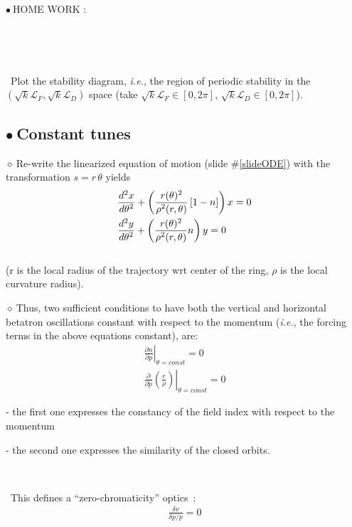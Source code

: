 \documentclass[12pt]{article}
\newcommand{\ie}{\textsl{i.e.}}
\newcommand{\nib}{\noindent \ensuremath{\bullet~}}
\newcommand{\nid}{\noindent \ensuremath{\diamond~}}
\newcommand{\nin}{\noindent~}
\newcommand{\blue}{\color{blue}}
\begin{document}
\clearpage



{\blue 

\fontsize{30}{36} \selectfont

\nib HOME WORK  : 

~

~


\nin Plot the stability diagram, \ie, the region of periodic stability 
in the  $(\sqrt{k} \mathcal{L}_F,  \sqrt{k} \mathcal{L}_D)$ space (take $\sqrt{k} \mathcal{L}_F\in[0, 2\pi]$, $  \sqrt{k} \mathcal{L}_D\in [0,2\pi]$).
}







\clearpage


{\fontsize{18}{28} \selectfont

\subsection*{\LARGE \nib  Constant tunes}


\nid Re-write the linearized equation of motion (slide \#\ref{slideODE})
with  the transformation $s = r \, \theta $  yields 
\begin{eqnarray}
& \frac{\textstyle{d^2x}}{\textstyle{d\theta^2}} + \left(\frac{\textstyle{r(\theta)^2}}{\textstyle{\rho^2(r,\theta)}}\left[1-n\right]\right) x = 0 \label{eq_motion2} \vspace{2mm} \nonumber \\
& \frac{\textstyle{d^2y}}{\textstyle{d\theta^2}} + \left(\frac{\textstyle{r(\theta)^2}}{\textstyle{\rho^2(r,\theta)}} n \right) y = 0 \nonumber 
\end{eqnarray}  \\
(r is the local radius of the trajectory wrt center of the ring, $\rho$ is the local curvature radius).


\nid Thus, two sufficient conditions to have both the vertical and horizontal betatron oscillations constant with respect to the momentum
(\ie, the forcing terms in the above equations constant), are:
\begin{eqnarray}
\left. \frac{\partial n}{\partial p} \right|_{\theta=const} = 0  \label{card1} \nonumber \\
\left. \frac{\partial}{\partial p}\left(\frac{r}{\rho}\right) \right|_{\theta=const} = 0 \label{card2}  \nonumber 
\end{eqnarray}

- the first one expresses the constancy of the field index with respect to the momentum 

- the second one expresses the similarity of the closed orbits. 

~

\nin This defines a ``zero-chromaticity''  optics~: \begin{eqnarray}  \frac{\delta \nu }{ \delta p/p}=0 \end{eqnarray}
}
\end{document}
